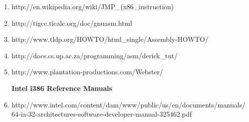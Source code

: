 \documentclass[11pt]{article}
\begin{document}
\begin{enumerate}
  \item  {http://en.wikipedia.org/wiki/JMP\_(x86\_instruction)}
  
  \item  {http://tigcc.ticalc.org/doc/gnuasm.html}
  
  \item  {http://www.tldp.org/HOWTO/html\_single/Assembly-HOWTO/}
 
 \item  {http://docs.cs.up.ac.za/programming/asm/derick\_tut/}
 
 \item  {http://www.plantation-productions.com/Webster/}
  
        \vspace {3 mm}
  
  \textbf{ Intel i386 Reference Manuals }
  
  \item  {http://www.intel.com/content/dam/www/public/us/en/documents/manuals/64-ia-32-architectures-software-developer-manual-325462.pdf}
 
 \end{enumerate} 
\end{document}
